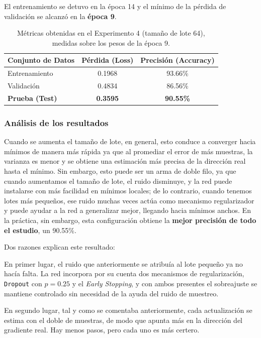 \documentclass[11pt, a4paper]{article}
\begin{document}
El entrenamiento se detuvo en la época 14 y el mínimo de la pérdida de validación se alcanzó en la \textbf{época 9}.

\begin{table}[H]
\centering
\caption{Métricas obtenidas en el Experimento 4 (tamaño de lote 64), medidas sobre los pesos de la época 9.}
\label{tab:resultados_exp4}
\begin{tabular}{l c c}
\toprule
\textbf{Conjunto de Datos} & \textbf{Pérdida (Loss)} & \textbf{Precisión (Accuracy)} \\
\midrule
Entrenamiento & 0.1968 & 93.66\% \\
Validación & 0.4834 & 86.56\% \\
\textbf{Prueba (Test)} & \textbf{0.3595} & \textbf{90.55\%} \\
\bottomrule
\end{tabular}
\end{table}

\subsubsection{Análisis de los resultados}

Cuando se aumenta el tamaño de lote, en general, esto conduce a converger hacia mínimos de manera más rápida ya que al promediar el error de más muestras, la varianza es menor y se obtiene una estimación más precisa de la dirección real hasta el mínimo. Sin embargo, esto puede ser un arma de doble filo, ya que cuando aumentamos el tamaño de lote, el ruido disminuye, y la red puede instalarse con más facilidad en mínimos locales; de lo contrario, cuando tenemos lotes más pequeños, ese ruido muchas veces actúa como mecanismo regularizador y puede ayudar a la red a generalizar mejor, llegando hacia mínimos anchos. En la práctica, sin embargo, esta configuración obtiene la \textbf{mejor precisión de todo el estudio}, un 90.55\%.

Dos razones explican este resultado:

En primer lugar, el ruido que anteriormente se atribuía al lote pequeño ya no hacía falta. La red incorpora por su cuenta dos mecanismos de regularización, \texttt{Dropout} con $p=0.25$ y el \textit{Early Stopping}, y con ambos presentes el sobreajuste se mantiene controlado sin necesidad de la ayuda del ruido de muestreo. 

En segundo lugar, tal y como se comentaba anteriormente, cada actualización se estima con el doble de muestras, de modo que apunta más en la dirección del gradiente real. Hay menos pasos, pero cada uno es más certero.
\end{document}
